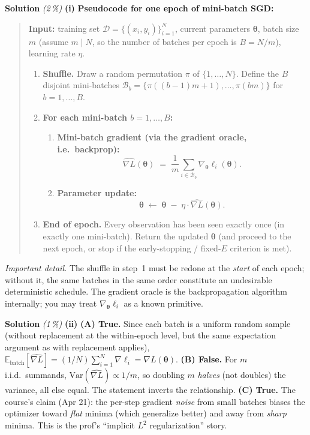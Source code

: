 \documentclass[11pt,a4paper]{article}
\newcommand{\subpoints}[1]{\textit{(#1\,\%)}}
\newcommand{\sol}{\noindent\textbf{Solution}}
\begin{document}
\sol{} \subpoints{2} \textbf{(i)} \textbf{Pseudocode for one epoch of mini-batch SGD:}
\begin{quote}\small
\textbf{Input:} training set $\mathcal D = \{(x_i, y_i)\}_{i=1}^N$, current parameters $\boldsymbol\theta$,
batch size $m$ (assume $m \mid N$, so the number of batches per epoch is $B = N/m$), learning rate $\eta$.

\begin{enumerate}
  \item \textbf{Shuffle.} Draw a random permutation $\pi$ of $\{1, \dots, N\}$. Define the $B$ disjoint
        mini-batches $\mathcal B_b = \{\pi((b-1)m + 1), \dots, \pi(bm)\}$ for $b = 1, \dots, B$.
  \item \textbf{For each mini-batch $b = 1, \dots, B$:}
    \begin{enumerate}
      \item \textbf{Mini-batch gradient (via the gradient oracle, i.e.\ backprop):}
        $$\widehat{\nabla L}(\boldsymbol\theta) \;=\; \frac{1}{m} \sum_{i \in \mathcal B_b} \nabla_{\boldsymbol\theta} \ell_i(\boldsymbol\theta).$$
      \item \textbf{Parameter update:}
        $$\boldsymbol\theta \;\leftarrow\; \boldsymbol\theta \;-\; \eta \cdot \widehat{\nabla L}(\boldsymbol\theta).$$
    \end{enumerate}
  \item \textbf{End of epoch.} Every observation has been seen exactly once (in exactly one mini-batch).
        Return the updated $\boldsymbol\theta$ (and proceed to the next epoch, or stop if the
        early-stopping / fixed-$E$ criterion is met).
\end{enumerate}
\end{quote}

\noindent\emph{Important detail.} The shuffle in step~1 must be redone at the \emph{start} of each
epoch; without it, the same batches in the same order constitute an undesirable deterministic
schedule. The gradient oracle is the backpropagation algorithm internally; you may treat
$\nabla_{\boldsymbol\theta} \ell_i$ as a known primitive.

\medskip
\sol{} \subpoints{1} \textbf{(ii)}
\textbf{(A) True.} Since each batch is a uniform random sample (without replacement at the
within-epoch level, but the same expectation argument as with replacement applies),
$\mathbb E_{\text{batch}}[\widehat{\nabla L}] = (1/N)\sum_{i=1}^N \nabla \ell_i = \nabla L(\boldsymbol\theta)$.
\textbf{(B) False.} For $m$ i.i.d.\ summands, $\mathrm{Var}(\widehat{\nabla L}) \propto 1/m$, so
doubling $m$ \emph{halves} (not doubles) the variance, all else equal. The statement inverts the
relationship.
\textbf{(C) True.} The course's claim (Apr 21): the per-step gradient \emph{noise} from small
batches biases the optimizer toward \emph{flat} minima (which generalize better) and away from
\emph{sharp} minima. This is the prof's ``implicit $L^2$ regularization'' story.
\end{document}
